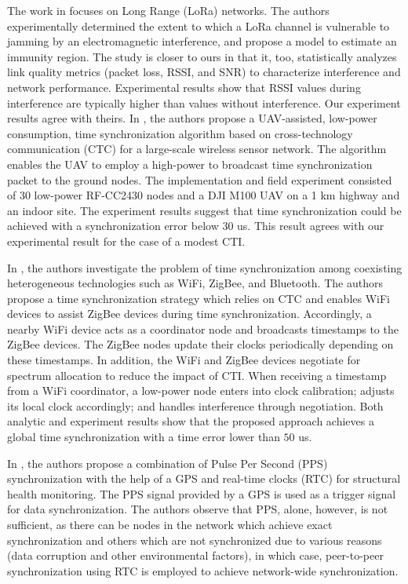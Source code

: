 The work in \cite{Luz_lorawan_block_interference_2020} focuses on Long Range (LoRa) networks. The authors experimentally determined the extent to which a LoRa channel is vulnerable to jamming by an electromagnetic interference, and propose a model to estimate an immunity region. The study is closer to ours in that it, too, statistically analyzes link quality metrics (packet loss, RSSI, and SNR) to characterize interference and network performance. Experimental results show that RSSI values during interference are typically higher than values without interference. Our experiment results agree with theirs. In \cite{Tan_uav_tsynchronization_2020}, the authors propose a UAV-assisted, low-power consumption, time synchronization algorithm based on cross-technology communication (CTC) \cite{kim2015freebee} for a large-scale wireless sensor network. The algorithm enables the UAV to employ a high-power to broadcast time synchronization packet to the ground nodes. The implementation and field experiment consisted of 30 low-power RF-CC2430 nodes and a DJI M100 UAV on a 1 km highway and an indoor site. The experiment results suggest  that time synchronization could be achieved with a synchronization error below $30$ us. This result agrees with our experimental result for the case of a modest CTI. %

In \cite{Gao_tsynch_cti_2023}, the authors investigate the problem of time synchronization among coexisting heterogeneous technologies such as WiFi, ZigBee, and Bluetooth. The authors propose a time synchronization strategy which relies on CTC and enables WiFi devices to assist ZigBee devices during time synchronization. Accordingly, a nearby WiFi device acts as a coordinator node and broadcasts timestamps to the ZigBee devices. The ZigBee nodes update their clocks periodically depending on these timestamps. In addition, the WiFi and ZigBee devices negotiate for spectrum allocation to reduce the impact of CTI. When receiving a timestamp from a WiFi coordinator, a low-power node enters into clock calibration; adjusts its local clock accordingly; and handles interference through negotiation. Both analytic and experiment results show that the proposed approach achieves a global time synchronization with a time error lower than $50$ us.

In \cite{Salazar_Lopez_gps_synchronization_2024}, the authors propose a combination of Pulse Per Second (PPS) synchronization with the help of a GPS  and real-time clocks (RTC) for structural health monitoring. The PPS signal provided by a GPS is used as a trigger signal for data synchronization. The authors observe that PPS, alone, however, is not sufficient, as there can be nodes in the network which achieve   exact synchronization and others which are not synchronized due to various reasons (data corruption and other environmental factors), in which case, peer-to-peer synchronization using RTC is employed to achieve network-wide synchronization. 
